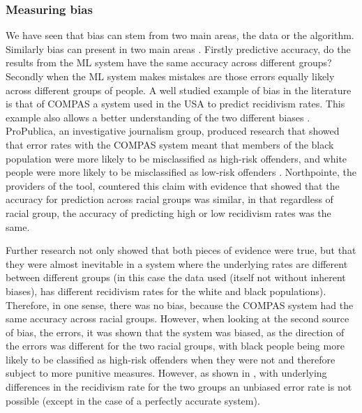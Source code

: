 \subsubsection{Measuring bias} We have seen that bias can stem from two main areas, the data or the algorithm. Similarly bias can present in two main areas \parencite{chouldechova2017fair}. Firstly predictive accuracy, do the results from the ML system have the same accuracy across different groups? Secondly when the ML system makes mistakes are those errors equally likely across different groups of people. A well studied example of bias in the literature is that of COMPAS a system used in the USA to predict recidivism rates. This example also allows a better understanding of the two different biases \parencite{kleinberg2016inherent, chouldechova2017fair}.  ProPublica, an investigative journalism group, produced research that showed that error rates with the COMPAS system meant that members of the black population were more likely to be misclassified as high-risk offenders, and white people were more likely to be misclassified as low-risk offenders   \parencite{jefflarson_2016}. Northpointe, the providers of the tool, countered this claim with evidence that showed that the accuracy for prediction across racial groups was similar, in that regardless of racial group, the accuracy of predicting high or low recidivism rates was the same.

Further research  \parencite{kleinberg2016inherent, chouldechova2017fair} not only showed that both pieces of evidence were true, but that they were almost inevitable in a system where the underlying rates are different between different groups (in this case the data used (itself not without inherent biases), has different recidivism rates for the white and black populations).  Therefore, in one sense, there was no bias, because the COMPAS system had the same accuracy across racial groups. However, when looking at the second source of bias, the errors, it was shown that the system was biased, as the direction of the errors was different for the two racial groups, with black people being more likely to be classified as high-risk offenders when they were not and therefore subject to more punitive measures. However, as shown in \textcite{kleinberg2016inherent}, with underlying differences in the recidivism rate for the two groups an unbiased error rate is not possible (except in the case of a perfectly accurate system). 

